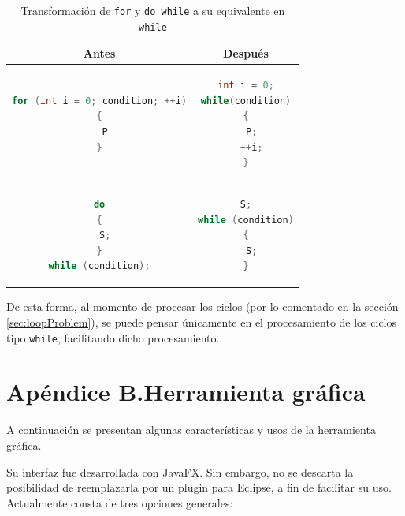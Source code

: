 \documentclass{llncs}
\begin{document}
\begin{table}
\centering
\begin{tabular}{|c | c|}
\hline
Antes & Después\\
\hline
\begin{lstlisting}[language=Java]
for (int i = 0; condition; ++i)
{
  P
}
\end{lstlisting} & 
\begin{lstlisting}[language=Java]
int i = 0;
while(condition)
{
  P;
  ++i;
}
\end{lstlisting}\\
\hline
\begin{lstlisting}[language=Java]
do
{
  S;
}
while (condition);
\end{lstlisting} & 
\begin{lstlisting}[language=Java]
S;
while (condition)
{
  S;
}
\end{lstlisting}\\
\hline
\end{tabular}
\caption{Transformación de \texttt{for} y \texttt{do while} a su equivalente en \texttt{while}}
\label{transfCiclos}
\end{table}

De esta forma, al momento de procesar los ciclos (por lo comentado en la sección \ref{sec:loopProblem}), se puede pensar únicamente en el procesamiento de los ciclos tipo
\texttt{while}, facilitando dicho procesamiento.


\section*{Apéndice B.\enspace Herramienta gráfica}\label{apend.B}
A continuación se presentan algunas características y usos de la herramienta gráfica.

Su interfaz fue desarrollada con JavaFX. Sin embargo, no se descarta la posibilidad de reemplazarla por un plugin para Eclipse, a fin de facilitar su uso.
Actualmente consta de tres opciones generales:
\end{document}
